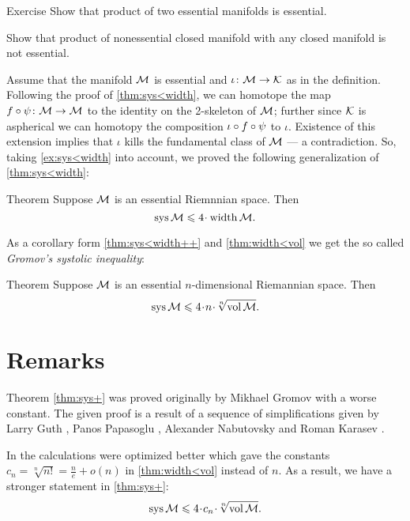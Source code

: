 \begin{thm}{Exercise}\label{ex:product-essential}
Show that product of two essential manifolds is essential.

Show that product of nonessential closed manifold with any closed manifold is not essential.
\end{thm}

Assume that the manifold $\mathcal{M}$ is essential and $\iota \colon\mathcal{M}\to \mathcal{K}$ as in the definition.
Following the proof of \ref{thm:sys<width}, we can homotope the map 
$f\circ\psi\colon\mathcal{M}\to \mathcal{M}$ to the identity on the 2-skeleton of $\mathcal{M}$;
further since $\mathcal{K}$ is aspherical we can homotopy the composition
$\iota\z\circ f\circ\psi$ to  $\iota$. 
Existence of this extension implies that $\iota$ kills the fundamental class of $\mathcal{M}$ --- a contradiction.
So, taking \ref{ex:sys<width} into account, we proved the following generalization of \ref{thm:sys<width}:

\begin{thm}{Theorem}\label{thm:sys<width++}
Suppose $\mathcal{M}$ is an essential Riemnnian space.
Then 
\[\sys\spc{M}\le 4 \cdot \width \spc{M}.\]
\end{thm}

As a corollary form \ref{thm:sys<width++} and \ref{thm:width<vol} we get the so called \emph{Gromov's systolic inequality}:

\begin{thm}{Theorem}\label{thm:sys+}
Suppose $\mathcal{M}$ is an essential $n$-dimensional Riemannian space.
Then 
\[\sys\spc{M}\le 4 \cdot n\cdot \sqrt[n]{\vol\spc{M}}.\]
\end{thm}


\section{Remarks}

Theorem \ref{thm:sys+} was proved originally by Mikhael Gromov \cite{gromov-1983} with a worse constant.
The given proof is a result of a sequence of simplifications given by Larry Guth \cite{guth},
Panos Papasoglu \cite{papasoglu},
Alexander Nabutovsky and Roman Karasev \cite{nabutovsky}.

In \cite{nabutovsky} the calculations were optimized better which gave the constants 
$c_n=\sqrt[n]{n!}= \tfrac ne+o(n)$ in \ref{thm:width<vol} instead of $n$.
As a result, we have a stronger statement in \ref{thm:sys+}:
\[\sys\spc{M}\le 4 \cdot c_n\cdot \sqrt[n]{\vol\spc{M}}.\]


